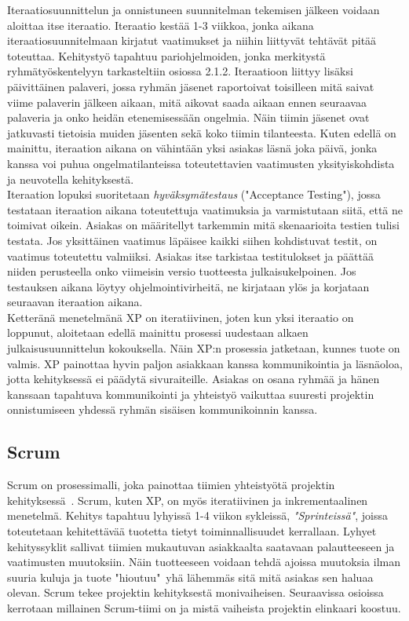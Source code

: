 \documentclass[finnish]{../tktltiki2}
\theoremstyle{definition}
\theoremstyle{remark}
\begin{document}
Iteraatiosuunnittelun ja onnistuneen suunnitelman tekemisen jälkeen voidaan aloittaa itse iteraatio. Iteraatio kestää 1-3 viikkoa, jonka aikana iteraatiosuunnitelmaan kirjatut vaatimukset ja niihin liittyvät tehtävät pitää toteuttaa. Kehitystyö tapahtuu pariohjelmoiden, jonka
merkitystä ryhmätyöskentelyyn tarkasteltiin osiossa 2.1.2. Iteraatioon liittyy lisäksi päivittäinen palaveri, jossa ryhmän jäsenet raportoivat toisilleen mitä saivat viime palaverin jälkeen aikaan, mitä aikovat saada aikaan ennen seuraavaa palaveria ja onko heidän etenemisessään ongelmia. Näin tiimin jäsenet ovat jatkuvasti tietoisia
muiden jäsenten sekä koko tiimin tilanteesta. Kuten edellä on mainittu, iteraation aikana on vähintään yksi asiakas läsnä joka päivä, jonka kanssa voi puhua ongelmatilanteissa toteutettavien vaatimusten yksityiskohdista ja neuvotella kehityksestä.\\

Iteraation lopuksi suoritetaan \emph{hyväksymätestaus} ("Acceptance Testing"), jossa testataan iteraation aikana toteutettuja vaatimuksia ja varmistutaan siitä, että ne toimivat oikein. Asiakas on määritellyt tarkemmin mitä skenaarioita testien tulisi testata. Jos yksittäinen vaatimus läpäisee kaikki siihen kohdistuvat testit, on vaatimus toteutettu valmiiksi. Asiakas itse tarkistaa testitulokset ja päättää niiden perusteella onko viimeisin versio tuotteesta julkaisukelpoinen. Jos testauksen aikana löytyy ohjelmointivirheitä, ne kirjataan ylös ja korjataan seuraavan iteraation aikana.\\

Ketteränä menetelmänä XP on iteratiivinen, joten kun yksi iteraatio on loppunut, aloitetaan edellä mainittu prosessi uudestaan alkaen julkaisusuunnittelun kokouksella. Näin XP:n prosessia jatketaan, kunnes tuote on valmis. XP painottaa hyvin paljon asiakkaan kanssa kommunikointia ja läsnäoloa, jotta kehityksessä ei päädytä sivuraiteille. Asiakas on osana ryhmää ja hänen kanssaan tapahtuva kommunikointi ja yhteistyö vaikuttaa suuresti projektin onnistumiseen yhdessä ryhmän sisäisen kommunikoinnin kanssa.

\subsection{Scrum}

Scrum on prosessimalli, joka painottaa tiimien yhteistyötä projektin 
kehityksessä~\cite{ScrumORG}. Scrum, kuten XP, on myös iteratiivinen 
ja inkrementaalinen menetelmä.
Kehitys tapahtuu lyhyissä 1-4 viikon sykleissä, 
\emph{"Sprinteissä"}, joissa toteutetaan kehitettävää tuotetta tietyt 
toiminnallisuudet kerrallaan. Lyhyet kehityssyklit sallivat tiimien 
mukautuvan asiakkaalta saatavaan palautteeseen ja vaatimusten 
muutoksiin. Näin tuotteeseen voidaan tehdä ajoissa
muutoksia ilman suuria kuluja ja tuote "hioutuu"~yhä lähemmäs sitä 
mitä asiakas sen haluaa olevan. Scrum tekee projektin kehityksestä
monivaiheisen. Seuraavissa osioissa kerrotaan millainen Scrum-tiimi
on ja mistä vaiheista projektin elinkaari koostuu.
\end{document}
